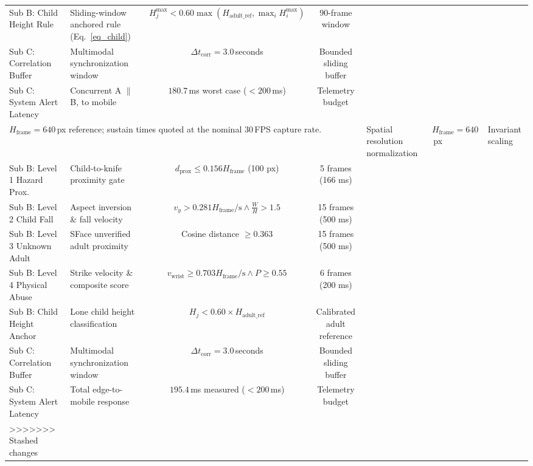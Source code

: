 \documentclass[conference]{IEEEtran}
\begin{document}
\begin{table}[htbp]
{\begin{tabular}{llcc}
Sub B: Child Height Rule & Sliding-window anchored rule (Eq.~\ref{eq_child}) & $H_j^{\max} < 0.60 \max(H_{\text{adult\_ref}}, \max_i H_i^{\max})$ & 90-frame window \\
Sub C: Correlation Buffer & Multimodal synchronization window & $\Delta t_{\text{corr}} = 3.0$\,seconds & Bounded sliding buffer \\
Sub C: System Alert Latency & Concurrent A $\|$ B, to mobile & $180.7$\,ms worst case ($< 200$\,ms) & Telemetry budget \\
\bottomrule
\multicolumn{4}{l}{\footnotesize $H_{\text{frame}} = 640$\,px reference; sustain times quoted at the nominal 30\,FPS capture rate.}
=======
Sub B: Frame Norm Height & Spatial resolution normalization & $H_{\text{frame}} = 640$\,px & Invariant scaling \\
Sub B: Level 1 Hazard Prox. & Child-to-knife proximity gate & $d_{\text{prox}} \le 0.156 H_{\text{frame}}$ (100 px) & 5 frames (166 ms) \\
Sub B: Level 2 Child Fall & Aspect inversion \& fall velocity & $v_y > 0.281 H_{\text{frame}}/\text{s} \land \frac{W}{H} > 1.5$ & 15 frames (500 ms) \\
Sub B: Level 3 Unknown Adult & SFace unverified adult proximity & Cosine distance $\ge 0.363$ & 15 frames (500 ms) \\
Sub B: Level 4 Physical Abuse & Strike velocity \& composite score & $v_{\text{wrist}} \ge 0.703 H_{\text{frame}}/\text{s} \land P \ge 0.55$ & 6 frames (200 ms) \\
Sub B: Child Height Anchor & Lone child height classification & $H_j < 0.60 \times H_{\text{adult\_ref}}$ & Calibrated adult reference \\
Sub C: Correlation Buffer & Multimodal synchronization window & $\Delta t_{\text{corr}} = 3.0$\,seconds & Bounded sliding buffer \\
Sub C: System Alert Latency & Total edge-to-mobile response & $195.4$\,ms measured ($< 200$\,ms) & Telemetry budget \\
\bottomrule
>>>>>>> Stashed changes
\end{tabular}
}
\label{tab_consolidated}
\end{table}
\end{document}
